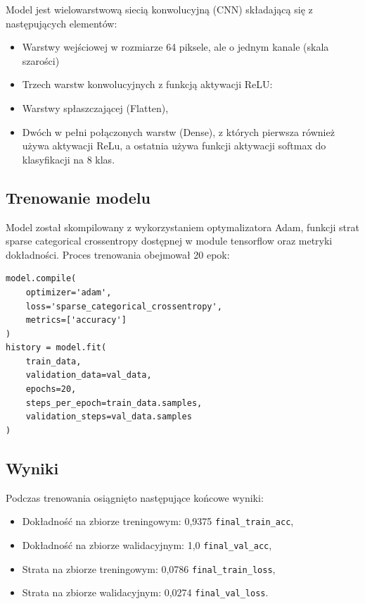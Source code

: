 Model jest wielowarstwową siecią konwolucyjną (CNN) składającą się z następujących elementów:

\begin{itemize}
    \item Warstwy wejściowej w rozmiarze 64  piksele, ale o jednym kanale (skala szarości)
    \item Trzech warstw konwolucyjnych z funkcją aktywacji ReLU:
    \item Warstwy spłaszczającej (Flatten),
    \item Dwóch w pełni połączonych warstw (Dense), z których pierwsza również używa aktywacji ReLu,
a ostatnia używa funkcji aktywacji softmax do klasyfikacji na 8 klas.
\end{itemize}

\subsection{Trenowanie modelu}\label{subsec:trenowanie-modelu}

Model został skompilowany z wykorzystaniem optymalizatora Adam,
funkcji strat sparse categorical crossentropy dostępnej w module tensorflow oraz metryki dokładności.
Proces trenowania obejmował 20 epok:

\begin{verbatim}
model.compile(
    optimizer='adam',
    loss='sparse_categorical_crossentropy',
    metrics=['accuracy']
)
history = model.fit(
    train_data,
    validation_data=val_data,
    epochs=20,
    steps_per_epoch=train_data.samples,
    validation_steps=val_data.samples
)
\end{verbatim}

\subsection{Wyniki}\label{subsec:wyniki}

Podczas trenowania osiągnięto następujące końcowe wyniki:

\begin{itemize}
    \item Dokładność na zbiorze treningowym: 0,9375 \texttt{final\_train\_acc},
    \item Dokładność na zbiorze walidacyjnym: 1,0  \texttt{final\_val\_acc},
    \item Strata na zbiorze treningowym: 0,0786  \texttt{final\_train\_loss},
    \item Strata na zbiorze walidacyjnym: 0,0274  \texttt{final\_val\_loss}.
\end{itemize}

